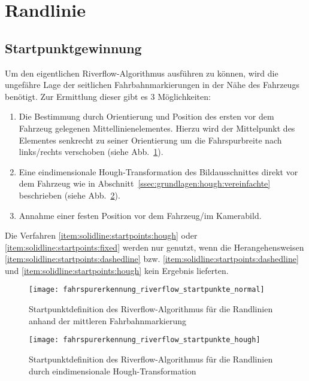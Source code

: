 \section{Randlinie \dcsecondauthorshort} \label{ssec:fahrspurerkennung:riverflow:randlinie}
\subsection{Startpunktgewinnung}
\label{sssec:fahrspurerkennung:riverflow:randlinie:startpunktgewinnung}
Um den eigentlichen Riverflow-Algorithmus ausführen zu können, wird die ungefähre Lage der seitlichen Fahrbahnmarkierungen in der Nähe des Fahrzeugs benötigt. Zur Ermittlung dieser gibt es 3 Möglichkeiten:
\begin{enumerate}
\item \label{item:solidline:startpoints:dashedline}
Die Bestimmung durch Orientierung und Position des ersten vor dem Fahrzeug gelegenen Mittellinienelementes. Hierzu wird der Mittelpunkt des Elementes senkrecht zu seiner Orientierung um die Fahrspurbreite nach links/rechts verschoben (siehe Abb.~\ref{fig:riverflow:randlinien:startpoints:dashedline}).
\item \label{item:solidline:startpoints:hough}
Eine eindimensionale Hough-Transformation des Bildausschnittes direkt vor dem Fahrzeug wie in Abschnitt~\ref{ssec:grundlagen:hough:vereinfachte} beschrieben (siehe Abb.~\ref{fig:riverflow:randlinien:startpoints:hough}). 
\item \label{item:solidline:startpoints:fixed}
Annahme einer festen Position vor dem Fahrzeug/im Kamerabild.
\end{enumerate}

Die Verfahren \ref{item:solidline:startpoints:hough} oder \ref{item:solidline:startpoints:fixed} werden nur genutzt, wenn die Herangehensweisen \ref{item:solidline:startpoints:dashedline} bzw. \ref{item:solidline:startpoints:dashedline} und \ref{item:solidline:startpoints:hough} kein Ergebnis lieferten.

\begin{figure}[H]
	\centering
	\texttt{[image: fahrspurerkennung\_riverflow\_startpunkte\_normal]}
	\caption{Startpunktdefinition des Riverflow-Algorithmus für die Randlinien anhand der mittleren Fahrbahnmarkierung}
	\label{fig:riverflow:randlinien:startpoints:dashedline}
\end{figure}

\begin{figure}[H]
	\centering
	\texttt{[image: fahrspurerkennung\_riverflow\_startpunkte\_hough]}
	\caption{Startpunktdefinition des Riverflow-Algorithmus für die Randlinien durch eindimensionale Hough-Transformation}
	\label{fig:riverflow:randlinien:startpoints:hough}
\end{figure}


